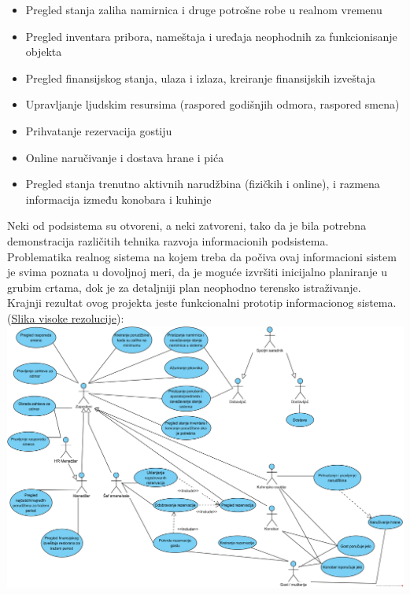 \documentclass{article}
\begin{document}
\begin{itemize}
\item Pregled stanja zaliha namirnica i druge potrošne robe u realnom vremenu
\item Pregled inventara pribora, nameštaja i uređaja neophodnih za funkcionisanje objekta
\item Pregled finansijskog stanja, ulaza i izlaza, kreiranje finansijskih izveštaja
\item Upravljanje ljudskim resursima (raspored godišnjih odmora, raspored smena)
\item Prihvatanje rezervacija gostiju
\item Online naručivanje i dostava hrane i pića
\item Pregled stanja trenutno aktivnih narudžbina (fizičkih i online), i razmena informacija između konobara i kuhinje
\end{itemize}

Neki od podsistema su otvoreni, a neki zatvoreni, tako da je bila potrebna demonstracija različitih tehnika razvoja
informacionih podsistema.\\

Problematika realnog sistema na kojem treba da počiva ovaj informacioni sistem je svima poznata u dovoljnoj meri, da je moguće izvršiti inicijalno planiranje u grubim crtama, dok je za detaljniji plan neophodno terensko istraživanje.\\

Krajnji rezultat ovog projekta jeste funkcionalni prototip informacionog sistema. (\href{https://raw.githubusercontent.com/bozidarrr/NajmanjiProblem/master/FinalniDokument/SU_0_grupni.png}{Slika visoke rezolucije}):\\

\includegraphics[width=\textwidth]{SU_0_grupni.png}
\end{document}
